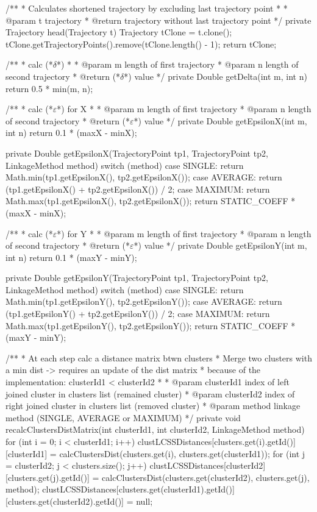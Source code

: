 {    /**
     * Calculates shortened trajectory by excluding last trajectory point
     *
     * @param t trajectory
     * @return trajectory without last trajectory point
     */
    private Trajectory head(Trajectory t) {
        Trajectory tClone = t.clone();
        tClone.getTrajectoryPoints().remove(tClone.length() - 1);
        return tClone;
    }

    /**
     * calc (*$\delta$*)
     *
     * @param m length of first trajectory
     * @param n length of second trajectory
     * @return (*$\delta$*) value
     */
    private Double getDelta(int m, int n) {
        return 0.5 * min(m, n);
    }

    /**
     * calc (*$\varepsilon$*) for X
     *
     * @param m length of first trajectory
     * @param n length of second trajectory
     * @return (*$\varepsilon$*) value
     */
    private Double getEpsilonX(int m, int n) {
        return 0.1 * (maxX - minX);
    }

	private Double getEpsilonX(TrajectoryPoint tp1, TrajectoryPoint tp2, LinkageMethod method) {
		switch (method) {
			case SINGLE:
				return Math.min(tp1.getEpsilonX(), tp2.getEpsilonX());
			case AVERAGE:
			return (tp1.getEpsilonX() + tp2.getEpsilonX()) / 2;
			case MAXIMUM:
			return Math.max(tp1.getEpsilonX(), tp2.getEpsilonX());
		}
		return STATIC_COEFF * (maxX - minX);
	}

    /**
     * calc (*$\varepsilon$*) for Y
     *
     * @param m length of first trajectory
     * @param n length of second trajectory
     * @return (*$\varepsilon$*) value
     */
    private Double getEpsilonY(int m, int n) {
        return 0.1 * (maxY - minY);
    }

	private Double getEpsilonY(TrajectoryPoint tp1, TrajectoryPoint tp2, LinkageMethod method) {
		switch (method) {
			case SINGLE:
				return Math.min(tp1.getEpsilonY(), tp2.getEpsilonY());
			case AVERAGE:
				return (tp1.getEpsilonY() + tp2.getEpsilonY()) / 2;
			case MAXIMUM:
			return Math.max(tp1.getEpsilonY(), tp2.getEpsilonY());
		}
		return STATIC_COEFF * (maxY - minY);
	}

    /**
     * At each step calc a distance matrix btwn clusters
     * Merge two clusters with a min dist -> requires an update of the dist matrix
     * because of the implementation: clusterId1 < clusterId2
     *
     * @param clusterId1 index of left joined cluster in clusters list (remained cluster)
     * @param clusterId2 index of right joined cluster in clusters list (removed cluster)
     * @param method	 linkage method (SINGLE, AVERAGE or MAXIMUM)
     */
    private void recalcClustersDistMatrix(int clusterId1, int clusterId2, LinkageMethod method) {
        for (int i = 0; i < clusterId1; i++) {
            clustLCSSDistances[clusters.get(i).getId()][clusterId1] = 
            	calcClustersDist(clusters.get(i), clusters.get(clusterId1));
        }
        for (int j = clusterId2; j < clusters.size(); j++) {
            clustLCSSDistances[clusterId2][clusters.get(j).getId()] = 
            	calcClustersDist(clusters.get(clusterId2), clusters.get(j), method);
        }
        clustLCSSDistances[clusters.get(clusterId1).getId()][clusters.get(clusterId2).getId()] = null;
    }

}
